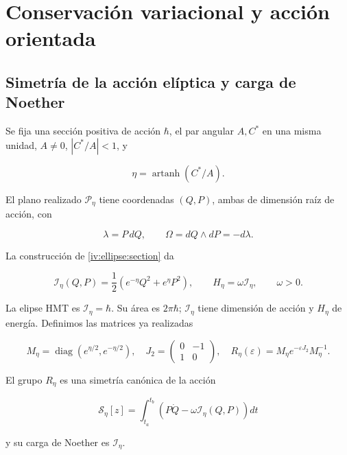 \section{Conservación variacional y acción orientada}
\label{nuclear:7}
\subsection{Simetría de la acción elíptica y carga de Noether}

Se fija una sección positiva de acción \(\hbar\), el par angular \(A,C^*\) en una misma unidad, \(A\ne0\), \(|C^*/A|<1\), y

\[
\eta=\operatorname{artanh}(C^*/A).
\]

El plano realizado \(\mathcal P_\eta\) tiene coordenadas \((Q,P)\), ambas de dimensión raíz de acción, con

\[
\lambda=P\,dQ,\qquad \Omega=dQ\wedge dP=-d\lambda.
\]

La construcción de \cref{iv:ellipse:section} da

\begin{equation}
\mathcal I_\eta(Q,P)=\frac12(e^{-\eta}Q^2+e^\eta P^2),
\qquad H_\eta=\omega\mathcal I_\eta,\qquad \omega>0.
\label{nuc07:eq:1}
\end{equation}

La elipse HMT es \(\mathcal I_\eta=\hbar\). Su área es \(2\pi\hbar\); \(\mathcal I_\eta\) tiene dimensión de acción y \(H_\eta\) de energía. Definimos las matrices ya realizadas

\begin{equation}
M_\eta=\operatorname{diag}(e^{\eta/2},e^{-\eta/2}),\quad
J_2=\begin{pmatrix}0&-1\\1&0\end{pmatrix},\quad
R_\eta(\varepsilon)=M_\eta e^{-\varepsilon J_2}M_\eta^{-1}.
\label{nuc07:eq:2}
\end{equation}

\begin{proposition}
El grupo \(R_\eta\) es una simetría canónica de la acción

\begin{equation}
\mathscr S_\eta[z]=\int_{t_a}^{t_b}
\left(P\dot Q-\omega\mathcal I_\eta(Q,P)\right)dt
\label{nuc07:eq:3}
\end{equation}

y su carga de Noether es \(\mathcal I_\eta\).
\end{proposition}

